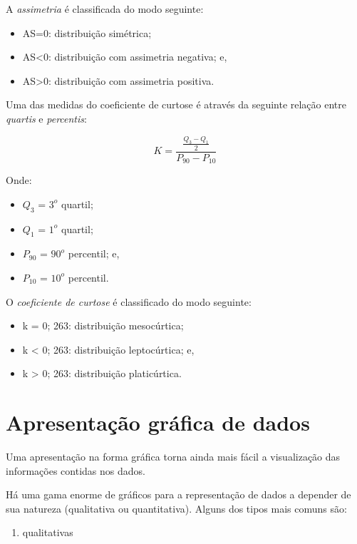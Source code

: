 \documentclass[
]{book}
\providecommand{\tightlist}{%
  \setlength{\itemsep}{0pt}\setlength{\parskip}{0pt}}
\begin{document}
A \emph{assimetria} é classificada do modo seguinte:

\begin{itemize}
\tightlist
\item
  AS=0: distribuição simétrica;
\item
  AS\textless0: distribuição com assimetria negativa; e,
\item
  AS\textgreater0: distribuição com assimetria positiva.
\end{itemize}

Uma das medidas do coeficiente de curtose é através da seguinte relação entre \emph{quartis} e \emph{percentis}:

\[
K = \frac{\frac{Q_{3} - Q_{1}}{2}   }   {P_{90} - P_{10}} 
\]

Onde:

\begin{itemize}
\tightlist
\item
  \(Q_{3}\) = \(3^{o}\) quartil;
\item
  \(Q_{1}\) = \(1^{o}\) quartil;
\item
  \(P_{90}\) = \(90^{o}\) percentil; e,
\item
  \(P_{10}\) = \(10^{o}\) percentil.
\end{itemize}

O \emph{coeficiente de curtose} é classificado do modo seguinte:

\begin{itemize}
\tightlist
\item
  k = 0; 263: distribuição mesocúrtica;
\item
  k \textless{} 0; 263: distribuição leptocúrtica; e,
\item
  k \textgreater{} 0; 263: distribuição platicúrtica.
\end{itemize}

\hypertarget{apresentauxe7uxe3o-gruxe1fica-de-dados}{%
\section{Apresentação gráfica de dados}\label{apresentauxe7uxe3o-gruxe1fica-de-dados}}

Uma apresentação na forma gráfica torna ainda mais fácil a visualização das informações contidas nos dados.

Há uma gama enorme de gráficos para a representação de dados a depender de sua natureza (qualitativa ou quantitativa). Alguns dos tipos mais comuns são:

\begin{enumerate}
\def\labelenumi{\arabic{enumi}.}
\tightlist
\item
  qualitativas
\end{enumerate}
\end{document}
